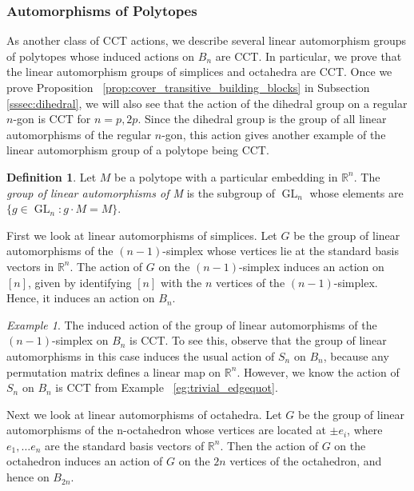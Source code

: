 \documentclass[smallextended, envcountsame, numbook]{svjour3}
\theoremstyle{plain}
\theoremstyle{definition}
\newtheorem{defn}[thm]{Definition}
\theoremstyle{remark}
\newtheorem{eg}[thm]{Example}
\numberwithin{equation}{section}
\newcommand\sssec{\subsubsection}
\begin{document}
\sssec{Automorphisms of Polytopes}
\label{sssec:polytopes}

As another class of CCT actions, we describe several linear automorphism groups of polytopes whose induced actions on $B_n$ are CCT. In particular, we prove that the linear automorphism groups of simplices and octahedra are CCT.
Once we prove Proposition ~\ref{prop:cover_transitive_building_blocks} in Subsection \ref{sssec:dihedral}, we will also see that the action of the dihedral group on a regular $n$-gon is CCT for $n = p,2p$.  Since the dihedral group is the group of all linear automorphisms of the regular $n$-gon, this action gives another example of the linear automorphism group of a polytope being CCT.

\begin{defn}
Let $M$ be a polytope with a particular embedding in $\mathbb R^n$. The {\it group of linear automorphisms of M} is the subgroup of $\operatorname{GL}_n$ whose elements are $\{g \in \operatorname{GL}_n\colon g \cdot M = M\}$.
\end{defn}

First we look at linear automorphisms of simplices. Let $G$ be the group of linear automorphisms of the $(n-1)$-simplex whose vertices lie at the standard basis vectors in $\mathbb R^n$. The action of $G$ on the $(n-1)$-simplex induces an action on $[n]$, given by identifying $[n]$ with the $n$ vertices of the $(n-1)$-simplex. Hence, it induces an action on $B_n$.

\begin{eg}
The induced action of the group of linear automorphisms of the $(n-1)$-simplex on $B_n$ is CCT. To see this, observe that the group of linear automorphisms in this case induces the usual action of $S_n$ on $B_n$, because any permutation matrix defines a linear map on $\mathbb R^n$. However, we know the action of $S_n$ on $B_n$ is CCT from Example ~\ref{eg:trivial_edgequot}.
\end{eg}

Next we look at linear automorphisms of octahedra. Let $G$ be the group of linear automorphisms of the n-octahedron whose vertices are located at $\pm e_i$, where $e_1,\ldots e_n$ are the standard basis vectors of $\mathbb R^n$. Then the action of $G$ on the octahedron induces an action of $G$ on the $2n$ vertices of the octahedron, and hence on $B_{2n}$.
\end{document}
